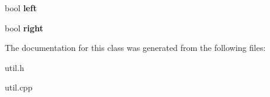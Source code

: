 \begin{DoxyCompactItemize}
\item 
\hypertarget{classpho_1_1WiiButtonState_a8b9824d50a2b20a926644f4e169d86df}{bool {\bfseries left}}\label{classpho_1_1WiiButtonState_a8b9824d50a2b20a926644f4e169d86df}

\item 
\hypertarget{classpho_1_1WiiButtonState_a5079d6e145b61c14c8d3a9b639de940f}{bool {\bfseries right}}\label{classpho_1_1WiiButtonState_a5079d6e145b61c14c8d3a9b639de940f}

\end{DoxyCompactItemize}


The documentation for this class was generated from the following files\-:\begin{DoxyCompactItemize}
\item 
util.\-h\item 
util.\-cpp\end{DoxyCompactItemize}
